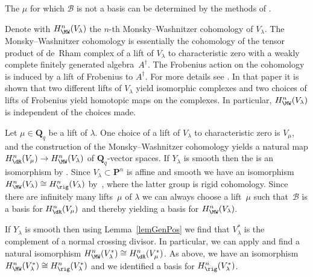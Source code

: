 \begin{Remark} The $\mu$ for which $\mathcal{B}$ is not a basis can be determined by the methods of \cite[Section~3]{PanTui}.
\end{Remark}

\begin{Remark}Denote with $H^n_{\MW}(V_{\lambda})$ the $n$-th Monsky--Washnitzer cohomology of $V_\lambda$. The Monsky--Washnitzer cohomology is essentially the cohomology of the tensor product of de~Rham complex of a lift of $V_{\lambda}$ to characteristic zero with a weakly complete f\/initely generated algebra~$A^{\dagger}$. The Frobenius action on the cohomology is induced by a lift of Frobenius to $A^{\dagger}$. For more details see \cite[Theorem~2.4.5]{PutMW}. In that paper it is shown that two dif\/ferent lifts of $V_{\lambda}$ yield isomorphic complexes and two choices of lifts of Frobenius yield homotopic maps on the complexes. In particular, $H^n_{\MW}(V_\lambda)$ is independent of the choices made.

Let $\mu\in \mathbf{Q}_q$ be a lift of $\lambda$. One choice of a lift of $V_\lambda$ to characteristic zero is $V_{\mu}$, and the construction of the Monsky--Washnitzer cohomology yields a natural map $H^n_{\dR}(V_\mu)\to H^n_{\MW}(V_\lambda)$ of $\mathbf{Q}_q$-vector spaces. If $Y_\lambda$ is smooth then the is an isomorphism by \cite{BalChi}. Since $V_\lambda \subset \mathbf{P}^n$ is af\/f\/ine and smooth we have an isomorphism $H^n_{\MW}(V_\lambda)\cong H^n_{\rig}(V_\lambda)$ by~\cite{BerSMF}, where the latter group is rigid cohomology. Since there are inf\/initely many lifts~$\mu$ of $\lambda$ we can always choose a lift~$\mu$ such that~$\mathcal{B}$ is a basis for $H^n_{\dR}(V_\mu)$ and thereby yielding a basis for $H^n_{\MW}(V_{\lambda})$.

If $Y_\lambda$ is smooth then using Lemma~\ref{lemGenPos} we f\/ind that $V_\lambda^*$ is the complement of a normal crossing divisor. In particular, we can apply \cite{BalChi} and f\/ind a natural isomorphism $H^n_{\MW}(V_\lambda^*)\cong H^n_{\dR}(V_\mu^*)$. As above, we have an isomorphism $H^n_{\MW}(V_\lambda^*)\cong H^n_{\rig}(V_\lambda^*)$ and we identif\/ied a basis for $H^n_{\rig}(V_\lambda^*)$.
\end{Remark}

